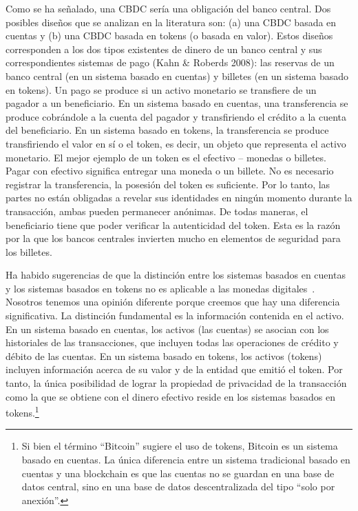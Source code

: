 \documentclass[a4paper,10pt]{article} %
\begin{document}
Como se ha señalado, una CBDC sería una obligación del banco central.
Dos posibles diseños que se analizan en la literatura son: (a) una CBDC
basada en cuentas y (b) una CBDC basada en tokens (o basada en valor).
Estos diseños corresponden a los dos tipos existentes de dinero de un
banco central y sus correspondientes sistemas de pago (Kahn \& Roberds
2008): las reservas de un banco central (en un sistema basado en
cuentas) y billetes (en un sistema basado en tokens). Un pago se produce
si un activo monetario se transfiere de un pagador a un beneficiario. En
un sistema basado en cuentas, una transferencia se produce cobrándole a
la cuenta del pagador y transfiriendo el crédito a la cuenta del
beneficiario. En un sistema basado en tokens, la transferencia se
produce transfiriendo el valor en sí o el token, es decir, un objeto que
representa el activo monetario. El mejor ejemplo de un token es el
efectivo -- monedas o billetes. Pagar con efectivo significa entregar
una moneda o un billete. No es necesario registrar la transferencia, la
posesión del token es suficiente. Por lo tanto, las partes no están
obligadas a revelar sus identidades en ningún momento durante la
transacción, ambas pueden permanecer anónimas. De todas maneras, el
beneficiario tiene que poder verificar la autenticidad del token. Esta
es la razón por la que los bancos centrales invierten mucho en elementos
de seguridad para los billetes.

Ha habido sugerencias de que la distinción entre los sistemas basados en
cuentas y los sistemas basados en tokens no es aplicable a las monedas
digitales~\cite{Garratt}. Nosotros tenemos una opinión diferente
porque creemos que hay una diferencia significativa. La distinción
fundamental es la información contenida en el activo. En un sistema
basado en cuentas, los activos (las cuentas) se asocian con los
historiales de las transacciones, que incluyen todas las operaciones de
crédito y débito de las cuentas. En un sistema basado en tokens, los
activos (tokens) incluyen información acerca de su valor y de la entidad
que emitió el token. Por tanto, la única posibilidad de lograr la
propiedad de privacidad de la transacción como la que se obtiene con el
dinero efectivo reside en los sistemas basados en tokens.\footnote
{Si bien el término ``Bitcoin'' sugiere el uso de tokens, Bitcoin es un
sistema basado en cuentas. La única diferencia entre un sistema
tradicional basado en cuentas y una blockchain es que las cuentas no
se guardan en una base de datos central, sino en una base de datos
descentralizada del tipo ``solo por anexión''.}
\end{document}
